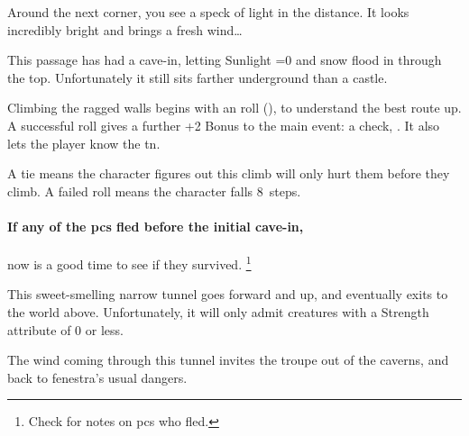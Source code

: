 \begin{multicols}{2}
  \skeinSwarm
\fi

\begin{boxtext}
  Around the next corner, you see a speck of light in the distance.
  It looks incredibly bright and brings a fresh wind\ldots
\end{boxtext}



This passage has had a cave-in, letting Sunlight \ifnum\value{temperature}=0 and snow \fi flood in through the top.
Unfortunately it still sits farther underground than a castle.

Climbing the ragged walls begins with an  roll (\tn[10]), to understand the best route up.
A successful roll gives a further +2 Bonus to the main event: a  check, \tn[14].
It also lets the player know the \gls{tn}.

A tie means the character figures out this climb will only hurt them before they climb.
A failed roll means the character falls 8~\glspl{step}.%

\paragraph{If any of the \glspl{pc} fled before the initial cave-in,}
now is a good time to see if they survived.%
\footnote{Check  for notes on \glspl{pc} who fled.}





This sweet-smelling narrow tunnel goes forward and up, and eventually exits to the world above.
Unfortunately, it will only admit creatures with a Strength \gls{attribute} of 0 or less.


\playCommentaryRestI
\playCommentaryRestII


The wind coming through this tunnel invites the troupe out of the caverns, and back to \gls{fenestra}'s usual dangers.

\end{multicols}

